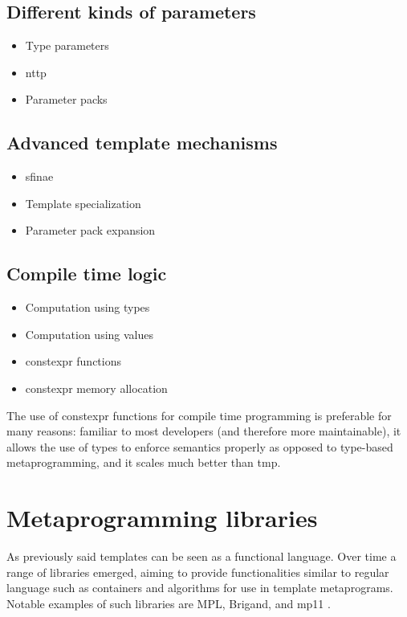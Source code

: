 \documentclass[../main]{subfiles}
\begin{document}
\subsection{
  Different kinds of parameters
}

\begin{itemize}
\item Type parameters
\item \gls{nttp}
\item Parameter packs
\end{itemize}

\subsection{
  Advanced \cpp template mechanisms
}

\begin{itemize}
\item \gls{sfinae}
\item Template specialization
\item Parameter pack expansion
\end{itemize}

\subsection{
  Compile time logic
}

\begin{itemize}
\item Computation using types %
\item Computation using values %
\item \gls{constexpr} functions %
\item \gls{constexpr} memory allocation %
\end{itemize}

The use of \gls{constexpr} functions for compile time programming is preferable
for many reasons: familiar to most \cpp developers (and therefore more
maintainable), it allows the use of types to enforce semantics properly
as opposed to type-based metaprogramming, and it scales much better than
\gls{tmp}.

\section{
  Metaprogramming libraries
}
\label{lbl:meta-libraries}

As previously said \cpp templates can be seen as a functional language.
Over time a range of libraries emerged, aiming to provide functionalities
similar to regular language such as containers and algorithms for use in
template metaprograms. Notable examples of such libraries are MPL\cite{mpl},
Brigand\cite{brigand}, and mp11 \cite{mp11}.
\end{document}

